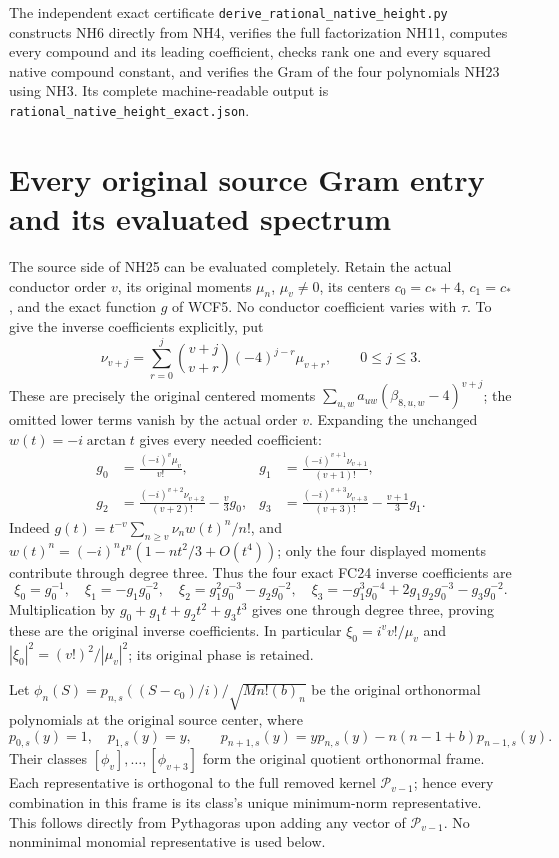 \documentclass[11pt]{article}
\begin{document}
The independent exact certificate
\texttt{derive\_rational\_native\_height.py} constructs NH6
directly from NH4, verifies the full factorization NH11,
computes every compound and its leading coefficient,
checks rank one and every squared native compound constant,
and verifies the Gram of the four polynomials NH23 using
NH3. Its complete machine-readable output is
\texttt{rational\_native\_height\_exact.json}.

\section{Every original source Gram entry and its evaluated spectrum}
The source side of NH25 can be evaluated completely. Retain
the actual conductor order $v$, its original moments $\mu_n$,
$\mu_v\ne0$, its centers $c_0=c_*+4$, $c_1=c_*$, and the
exact function $g$ of WCF5. No conductor coefficient varies
with $\tau$. To give the inverse coefficients explicitly, put
\[
 \nu_{v+j}=\sum_{r=0}^j\binom{v+j}{v+r}(-4)^{j-r}\mu_{v+r},
 \qquad 0\le j\le3.
 \tag{NH26}
\]
These are precisely the original centered moments
$\sum_{u,w}a_{uw}(\beta_{8,u,w}-4)^{v+j}$; the omitted
lower terms vanish by the actual order $v$. Expanding the
unchanged $w(t)=-i\arctan t$ gives every needed coefficient:
\[
\begin{aligned}
 g_0&=\frac{(-i)^v\mu_v}{v!},&
 g_1&=\frac{(-i)^{v+1}\nu_{v+1}}{(v+1)!},\\
 g_2&=\frac{(-i)^{v+2}\nu_{v+2}}{(v+2)!}
                           -\frac v3g_0,&
 g_3&=\frac{(-i)^{v+3}\nu_{v+3}}{(v+3)!}
                           -\frac{v+1}{3}g_1.
\end{aligned}\tag{NH27}
\]
Indeed $g(t)=t^{-v}\sum_{n\ge v}\nu_nw(t)^n/n!$,
and $w(t)^n=(-i)^nt^n(1-nt^2/3+O(t^4))$; only the
four displayed moments contribute through degree three.
Thus the four exact FC24 inverse coefficients are
\[
 \xi_0=g_0^{-1},\quad \xi_1=-g_1g_0^{-2},\quad
 \xi_2=g_1^2g_0^{-3}-g_2g_0^{-2},\quad
 \xi_3=-g_1^3g_0^{-4}+2g_1g_2g_0^{-3}-g_3g_0^{-2}.
 \tag{NH28}
\]
Multiplication by $g_0+g_1t+g_2t^2+g_3t^3$ gives one
through degree three, proving these are the original inverse
coefficients. In particular
$\xi_0=i^vv!/\mu_v$ and
$|\xi_0|^2=(v!)^2/|\mu_v|^2$; its original phase is retained.

Let $\phi_n(S)=p_{n,s}((S-c_0)/i)/\sqrt{Mn!(b)_n}$ be
the original orthonormal polynomials at the original source
center, where
\[
 p_{0,s}(y)=1,\quad p_{1,s}(y)=y,\qquad
 p_{n+1,s}(y)=yp_{n,s}(y)-n(n-1+b)p_{n-1,s}(y).
 \tag{NH29}
\]
Their classes $[\phi_v],\ldots,[\phi_{v+3}]$ form the
original quotient orthonormal frame. Each representative is
orthogonal to the full removed kernel $\mathcal P_{v-1}$;
hence every combination in this frame is its class's unique
minimum-norm representative. This follows directly from
Pythagoras upon adding any vector of $\mathcal P_{v-1}$.
No nonminimal monomial representative is used below.
\end{document}
